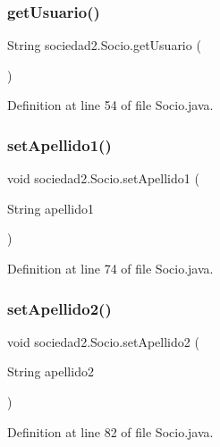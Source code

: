 \subsubsection{\texorpdfstring{get\+Usuario()}{getUsuario()}}
{\footnotesize\ttfamily String sociedad2.\+Socio.\+get\+Usuario (\begin{DoxyParamCaption}{ }\end{DoxyParamCaption})}



Definition at line 54 of file Socio.\+java.

\mbox{\label{classsociedad2_1_1_socio_ac369f758c3a627def2a30e48df272485}} 
\subsubsection{\texorpdfstring{set\+Apellido1()}{setApellido1()}}
{\footnotesize\ttfamily void sociedad2.\+Socio.\+set\+Apellido1 (\begin{DoxyParamCaption}\item[{String}]{apellido1 }\end{DoxyParamCaption})}



Definition at line 74 of file Socio.\+java.

\mbox{\label{classsociedad2_1_1_socio_a90b515239e7d30207498da73e1149177}} 
\subsubsection{\texorpdfstring{set\+Apellido2()}{setApellido2()}}
{\footnotesize\ttfamily void sociedad2.\+Socio.\+set\+Apellido2 (\begin{DoxyParamCaption}\item[{String}]{apellido2 }\end{DoxyParamCaption})}



Definition at line 82 of file Socio.\+java.

\mbox{\label{classsociedad2_1_1_socio_a64c11ba08624bb242e4580f9c29c4c63}} 
